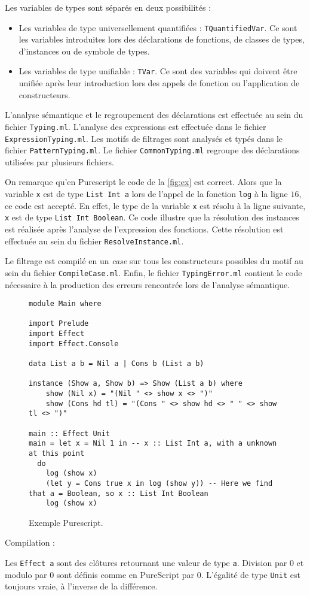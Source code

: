 \documentclass[french, 12pt]{article}
\newcommand{\ps}{\textsf{Purescript}}
\begin{document}
Les variables de types sont séparés en deux possibilités :
\begin{itemize}
    \item Les variables de type universellement quantifiées : \verb|TQuantifiedVar|.
          Ce sont les variables introduites lors des déclarations de fonctions,
          de classes de types, d'instances ou de symbole de types.
    \item Les variables de type unifiable : \verb|TVar|. Ce sont des variables
          qui doivent être unifiée après leur introduction lors des appels de
          fonction ou l'application de constructeurs.
\end{itemize}

L'analyse sémantique et le regroupement des déclarations est effectuée au sein
du fichier \verb|Typing.ml|. L'analyse des expressions est effectuée dans le
fichier \verb|ExpressionTyping.ml|. Les motifs de filtrages sont analysés et
typés dans le fichier \verb|PatternTyping.ml|. Le fichier \verb|CommonTyping.ml|
regroupe des déclarations utilisées par plusieurs fichiers.

On remarque qu'en \ps{} le code de la \autoref{fig:ex} est correct. Alors que
la variable \verb|x| est de type \verb|List Int a| lors de l'appel de la fonction
\verb|log| à la ligne $16$, ce code est accepté. En effet, le type de la
variable \verb|x| est résolu à la ligne suivante, \verb|x| est de type
\verb|List Int Boolean|. Ce code illustre que la résolution des instances est réalisée
après l'analyse de l'expression des fonctions. Cette résolution est effectuée
au sein du fichier \verb|ResolveInstance.ml|.

Le filtrage est compilé en un \emph{case} sur tous les constructeurs possibles
du motif au sein du fichier \verb|CompileCase.ml|. Enfin, le fichier
\verb|TypingError.ml| contient le code nécessaire à la production des erreurs
rencontrée lors de l'analyse sémantique.

\begin{figure}[H]
    \begin{verbatim}
module Main where

import Prelude
import Effect
import Effect.Console

data List a b = Nil a | Cons b (List a b)

instance (Show a, Show b) => Show (List a b) where
    show (Nil x) = "(Nil " <> show x <> ")"
    show (Cons hd tl) = "(Cons " <> show hd <> " " <> show tl <> ")"

main :: Effect Unit
main = let x = Nil 1 in -- x :: List Int a, with a unknown at this point
  do
    log (show x)
    (let y = Cons true x in log (show y)) -- Here we find that a = Boolean, so x :: List Int Boolean
    log (show x)
        \end{verbatim}
    \caption{Exemple \ps{}.}
    \label{fig:ex}
\end{figure}



Compilation :

Les \texttt{Effect a} sont des clôtures retournant une valeur de type \texttt{a}.
Division par $0$ et modulo par $0$ sont définis comme en PureScript par $0$.
L'égalité de type \texttt{Unit} est toujours vraie, à l'inverse de la différence.
\end{document}
